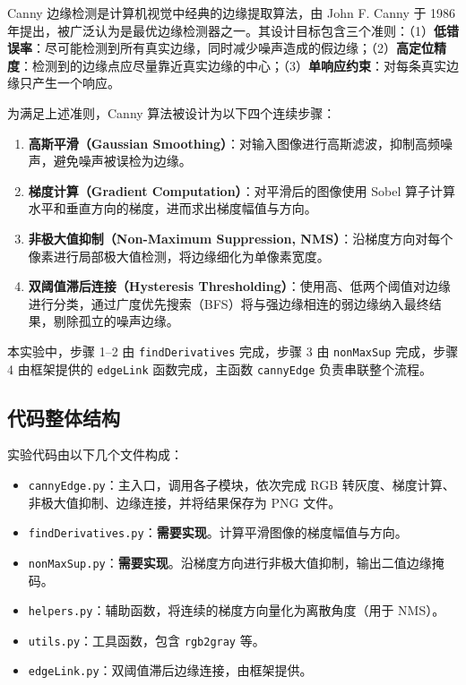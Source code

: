 \documentclass[12pt,a4paper]{ctexart}
\begin{document}
Canny 边缘检测是计算机视觉中经典的边缘提取算法，由 John F. Canny 于 1986 年提出，被广泛认为是最优边缘检测器之一。其设计目标包含三个准则：（1）\textbf{低错误率}：尽可能检测到所有真实边缘，同时减少噪声造成的假边缘；（2）\textbf{高定位精度}：检测到的边缘点应尽量靠近真实边缘的中心；（3）\textbf{单响应约束}：对每条真实边缘只产生一个响应。

为满足上述准则，Canny 算法被设计为以下四个连续步骤：

\begin{enumerate}
  \item \textbf{高斯平滑（Gaussian Smoothing）}：对输入图像进行高斯滤波，抑制高频噪声，避免噪声被误检为边缘。
  \item \textbf{梯度计算（Gradient Computation）}：对平滑后的图像使用 Sobel 算子计算水平和垂直方向的梯度，进而求出梯度幅值与方向。
  \item \textbf{非极大值抑制（Non-Maximum Suppression, NMS）}：沿梯度方向对每个像素进行局部极大值检测，将边缘细化为单像素宽度。
  \item \textbf{双阈值滞后连接（Hysteresis Thresholding）}：使用高、低两个阈值对边缘进行分类，通过广度优先搜索（BFS）将与强边缘相连的弱边缘纳入最终结果，剔除孤立的噪声边缘。
\end{enumerate}

本实验中，步骤 1--2 由 \texttt{findDerivatives} 完成，步骤 3 由 \texttt{nonMaxSup} 完成，步骤 4 由框架提供的 \texttt{edgeLink} 函数完成，主函数 \texttt{cannyEdge} 负责串联整个流程。

\subsection{代码整体结构}

实验代码由以下几个文件构成：

\begin{itemize}
  \item \texttt{cannyEdge.py}：主入口，调用各子模块，依次完成 RGB 转灰度、梯度计算、非极大值抑制、边缘连接，并将结果保存为 PNG 文件。
  \item \texttt{findDerivatives.py}：\textbf{需要实现}。计算平滑图像的梯度幅值与方向。
  \item \texttt{nonMaxSup.py}：\textbf{需要实现}。沿梯度方向进行非极大值抑制，输出二值边缘掩码。
  \item \texttt{helpers.py}：辅助函数，将连续的梯度方向量化为离散角度（用于 NMS）。
  \item \texttt{utils.py}：工具函数，包含 \texttt{rgb2gray} 等。
  \item \texttt{edgeLink.py}：双阈值滞后边缘连接，由框架提供。
\end{itemize}
\end{document}

